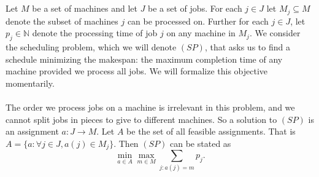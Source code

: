 \documentclass[letterpaper,12pt,oneside,onecolumn]{article}
\newcommand{\N}{\mathbb{N}} \newcommand{\R}{\mathbb{R}}
\begin{document}
\section{}

\section{}
\paragraph{}
Let $M$ be a set of machines and let $J$ be a set of jobs. For each $j \in J$ let $M_j \subseteq M$ denote the subset of machines $j$ can be processed on. Further for each $j \in J$, let $p_j \in \N$ denote the processing time of job $j$ on any machine in $M_j$. We consider the scheduling problem, which we will denote $(SP)$, that asks us to find a schedule minimizing the makespan: the maximum completion time of any machine provided we process all jobs. We will formalize this objective momentarily.
\paragraph{}
The order we process jobs on a machine is irrelevant in this problem, and we cannot split jobs in pieces to give to different machines. So a solution to $(SP)$ is an assignment $a: J \rightarrow M$. Let $A$ be the set of all feasible assignments. That is $A = \{ a : \forall j \in J, a(j) \in M_j\}.$ Then $(SP)$ can be stated as
$$\min_{a \in A} \max_{m \in M} \sum_{j : a(j) = m} p_j.$$
\end{document}
